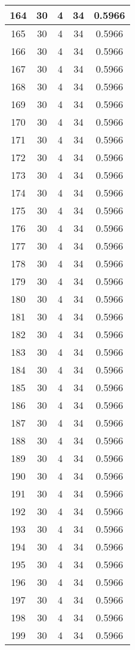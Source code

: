 \documentclass[letterpaper, 12pt]{article}
\begin{document}
\begin{longtable}{|c|c|c|c|c|}
\hline
164 & 30 & 4 & 34 & 0.5966 \\
\hline
165 & 30 & 4 & 34 & 0.5966 \\
\hline
166 & 30 & 4 & 34 & 0.5966 \\
\hline
167 & 30 & 4 & 34 & 0.5966 \\
\hline
168 & 30 & 4 & 34 & 0.5966 \\
\hline
169 & 30 & 4 & 34 & 0.5966 \\
\hline
170 & 30 & 4 & 34 & 0.5966 \\
\hline
171 & 30 & 4 & 34 & 0.5966 \\
\hline
172 & 30 & 4 & 34 & 0.5966 \\
\hline
173 & 30 & 4 & 34 & 0.5966 \\
\hline
174 & 30 & 4 & 34 & 0.5966 \\
\hline
175 & 30 & 4 & 34 & 0.5966 \\
\hline
176 & 30 & 4 & 34 & 0.5966 \\
\hline
177 & 30 & 4 & 34 & 0.5966 \\
\hline
178 & 30 & 4 & 34 & 0.5966 \\
\hline
179 & 30 & 4 & 34 & 0.5966 \\
\hline
180 & 30 & 4 & 34 & 0.5966 \\
\hline
181 & 30 & 4 & 34 & 0.5966 \\
\hline
182 & 30 & 4 & 34 & 0.5966 \\
\hline
183 & 30 & 4 & 34 & 0.5966 \\
\hline
184 & 30 & 4 & 34 & 0.5966 \\
\hline
185 & 30 & 4 & 34 & 0.5966 \\
\hline
186 & 30 & 4 & 34 & 0.5966 \\
\hline
187 & 30 & 4 & 34 & 0.5966 \\
\hline
188 & 30 & 4 & 34 & 0.5966 \\
\hline
189 & 30 & 4 & 34 & 0.5966 \\
\hline
190 & 30 & 4 & 34 & 0.5966 \\
\hline
191 & 30 & 4 & 34 & 0.5966 \\
\hline
192 & 30 & 4 & 34 & 0.5966 \\
\hline
193 & 30 & 4 & 34 & 0.5966 \\
\hline
194 & 30 & 4 & 34 & 0.5966 \\
\hline
195 & 30 & 4 & 34 & 0.5966 \\
\hline
196 & 30 & 4 & 34 & 0.5966 \\
\hline
197 & 30 & 4 & 34 & 0.5966 \\
\hline
198 & 30 & 4 & 34 & 0.5966 \\
\hline
199 & 30 & 4 & 34 & 0.5966 \\
\hline
\end{longtable}
\end{document}
